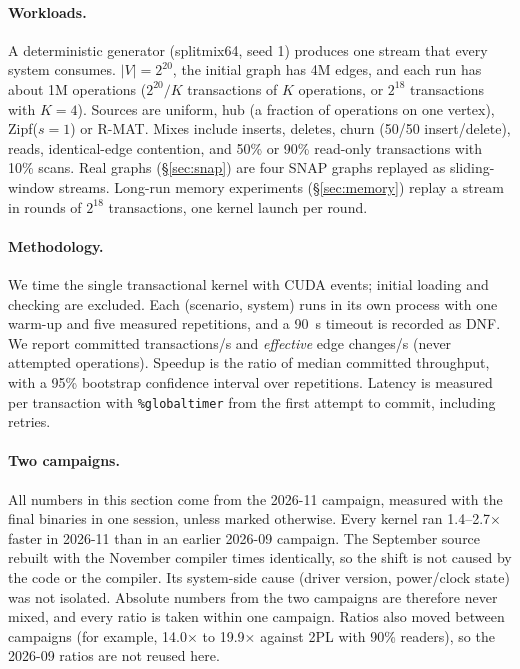 \documentclass[sigconf,nonacm]{acmart}
\newcommand{\code}[1]{\texttt{#1}}
\begin{document}
\paragraph{Workloads.} A deterministic generator (splitmix64, seed 1) produces one stream that every system consumes.
$|V| = 2^{20}$, the initial graph has 4M edges, and each run has about 1M operations
($2^{20}/K$ transactions of $K$ operations, or $2^{18}$ transactions with $K{=}4$). Sources are uniform, hub
(a fraction of operations on one vertex), Zipf($s{=}1$) or R-MAT. Mixes include inserts, deletes, churn
(50/50 insert/delete), reads, identical-edge contention, and 50\% or 90\% read-only transactions with 10\% scans.
Real graphs (\S\ref{sec:snap}) are four SNAP graphs replayed as sliding-window streams. Long-run memory experiments
(\S\ref{sec:memory}) replay a stream in rounds of $2^{18}$ transactions, one kernel launch per round.

\paragraph{Methodology.} We time the single transactional kernel with CUDA events; initial loading and checking are
excluded. Each (scenario, system) runs in its own process with one warm-up and five measured repetitions, and a 90~s
timeout is recorded as DNF. We report committed transactions/s and \emph{effective} edge changes/s (never attempted
operations). Speedup is the ratio of median committed throughput, with a 95\% bootstrap confidence interval over
repetitions. Latency is measured per transaction with \code{\%globaltimer} from the first attempt to commit, including
retries.

\paragraph{Two campaigns.} All numbers in this section come from the 2026-11 campaign, measured with the final
binaries in one session, unless marked otherwise. Every kernel ran 1.4--2.7$\times$ faster in
2026-11 than in an earlier 2026-09 campaign. The September source rebuilt with the November compiler times
identically, so the shift is not caused by the code or the compiler. Its system-side cause (driver version,
power/clock state) was not isolated. Absolute numbers from the two campaigns are therefore never mixed, and every ratio is
taken within one campaign. Ratios also moved between campaigns (for example, 14.0$\times$ to 19.9$\times$ against 2PL
with 90\% readers), so the 2026-09 ratios are not reused here.
\end{document}
